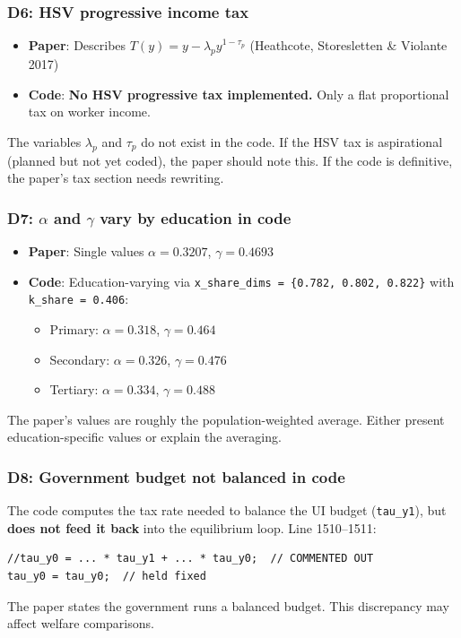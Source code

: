 \documentclass[11pt]{article}
\begin{document}
\subsubsection*{D6: HSV progressive income tax}

\begin{itemize}
    \item \textbf{Paper}: Describes $T(y) = y - \lambda_p y^{1-\tau_p}$ (Heathcote, Storesletten \& Violante 2017)
    \item \textbf{Code}: \textbf{No HSV progressive tax implemented.} Only a flat proportional tax on worker income.
\end{itemize}
The variables $\lambda_p$ and $\tau_p$ do not exist in the code. If the HSV tax is aspirational (planned but not yet coded), the paper should note this. If the code is definitive, the paper's tax section needs rewriting.

\subsubsection*{D7: $\alpha$ and $\gamma$ vary by education in code}

\begin{itemize}
    \item \textbf{Paper}: Single values $\alpha = 0.3207$, $\gamma = 0.4693$
    \item \textbf{Code}: Education-varying via \texttt{x\_share\_dims = \{0.782, 0.802, 0.822\}} with \texttt{k\_share = 0.406}:
    \begin{itemize}
        \item Primary: $\alpha = 0.318$, $\gamma = 0.464$
        \item Secondary: $\alpha = 0.326$, $\gamma = 0.476$
        \item Tertiary: $\alpha = 0.334$, $\gamma = 0.488$
    \end{itemize}
\end{itemize}
The paper's values are roughly the population-weighted average. Either present education-specific values or explain the averaging.

\subsubsection*{D8: Government budget not balanced in code}

The code computes the tax rate needed to balance the UI budget (\texttt{tau\_y1}), but \textbf{does not feed it back} into the equilibrium loop. Line 1510--1511:
\begin{verbatim}
//tau_y0 = ... * tau_y1 + ... * tau_y0;  // COMMENTED OUT
tau_y0 = tau_y0;  // held fixed
\end{verbatim}
The paper states the government runs a balanced budget. This discrepancy may affect welfare comparisons.
\end{document}
